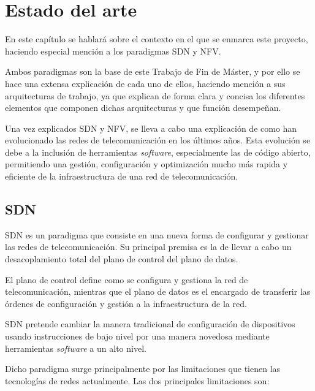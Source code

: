 \chapter{Estado del arte}
\label{estadodelarte}

En este capítulo se hablará sobre el contexto en el que se enmarca este proyecto, haciendo especial mención a los paradigmas \ac{SDN} y \ac{NFV}.

Ambos paradigmas son la base de este Trabajo de Fin de Máster, y por ello se hace una extensa explicación de cada uno de ellos, haciendo mención a sus arquitecturas de trabajo, ya que explican de forma clara y concisa los diferentes elementos que componen dichas arquitecturas y que función desempeñan.

Una vez explicados \ac{SDN} y \ac{NFV}, se lleva a cabo una explicación de como han evolucionado las redes de telecomunicación en los últimos años. Esta evolución se debe a la inclusión de herramientas \textit{software}, especialmente las de código abierto, permitiendo una gestión, configuración y optimización mucho más rapida y eficiente de la infraestructura de una red de telecomunicación.

\section{SDN}
\label{sec:sdn}

\ac{SDN} es un paradigma que consiste en una nueva forma de configurar y gestionar las redes de telecomunicación. Su principal premisa es la de llevar a cabo un desacoplamiento total del plano de control del plano de datos.\cite{sdnbib}\cite{onf2012bib}

El plano de control define como se configura y gestiona la red de telecomunicación, mientras que el plano de datos es el encargado de transferir las órdenes de configuración y gestión a la infraestructura de la red.

\ac{SDN} pretende cambiar la manera tradicional de configuración de dispositivos usando instrucciones de bajo nivel por una manera novedosa mediante herramientas \textit{software} a un alto nivel.\cite{sdnbib}

Dicho paradigma surge principalmente por las limitaciones que tienen las tecnologías de redes actualmente. Las dos principales limitaciones son:

